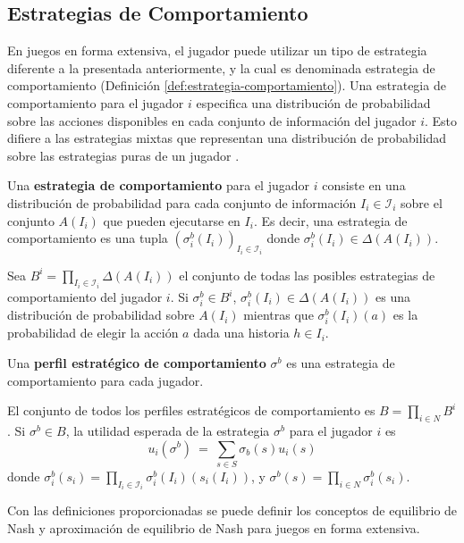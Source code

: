 \subsection{Estrategias de Comportamiento}

En juegos en forma extensiva, el jugador puede utilizar un tipo de estrategia diferente a la presentada anteriormente, y la cual es denominada estrategia de comportamiento (Definición \ref{def:estrategia-comportamiento}). Una estrategia de comportamiento para el jugador $i$ especifica una distribución de probabilidad sobre las acciones disponibles en cada conjunto de información del jugador $i$. Esto difiere a las estrategias mixtas que representan una distribución de probabilidad sobre las estrategias puras de un jugador \cite[p. 212]{bib:course-game-theory}. 

\begin{definition}
\label{def:estrategia-comportamiento}
Una \textbf{estrategia de comportamiento} para el jugador $i$ consiste en una distribución de probabilidad para cada conjunto de información $I_i \in \mathcal{I}_i$ sobre el conjunto $A(I_i)$ que pueden ejecutarse en $I_i$.
Es decir, una estrategia de comportamiento es una tupla $(\sigma^b_i(I_i))_{I_i \in \mathcal{I}_i}$ donde $\sigma^b_i(I_i) \in \Delta(A(I_i))$.
\end{definition}

Sea $B^i = \prod_{I_i \in \mathcal{I}_i} \Delta(A(I_i))$ el conjunto de todas las posibles estrategias de comportamiento del jugador $i$. Si $\sigma_i^b \in B^i$, $\sigma_i^b(I_i) \in \Delta(A(I_i))$ es una distribución de probabilidad sobre $A(I_i)$ mientras que $\sigma_i^b(I_i)(a)$ es la probabilidad de elegir la acción $a$ dada una historia $h \in I_i$.

\begin{definition}
Una \textbf{perfil estratégico de comportamiento} $\sigma^b$ es una estrategia de comportamiento para cada jugador.
\end{definition}

El conjunto de todos los perfiles estratégicos de comportamiento es $B = \prod_{i \in N} B^i$. Si $\sigma^b \in B$, la utilidad esperada de la estrategia $\sigma^b$ para el jugador $i$ es
\[ u_i(\sigma^b)\ =\ \sum_{s \in S} \sigma_b(s)u_i(s) \]
donde $\sigma_i^b(s_i) = \prod_{I_i \in \mathcal{I}_i} \sigma_i^b(I_i)(s_i(I_i))$, y $\sigma^b(s) =  \prod_{i \in N} \sigma_i^b(s_i)$.

Con las definiciones proporcionadas se puede definir los conceptos de equilibrio de Nash y aproximación de equilibrio de Nash para juegos en forma extensiva.

